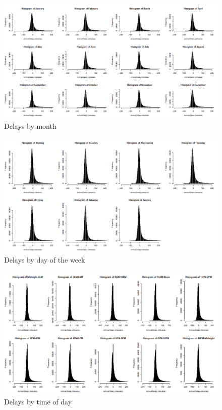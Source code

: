 \documentclass[12pt, a4paper, openany]{book}
\begin{document}
			\begin{figure}[h]
			\centering
	 		\includegraphics[width =1\textwidth]{../figures/PLOTS FOR REPORT/Chapter 4/Figure 4.32}
	 		\caption{Delays by month}
	 		\end{figure}

			\begin{figure}[h]
			\centering
	 		\includegraphics[width = 1 \textwidth]{../figures/PLOTS FOR REPORT/Chapter 4/Figure 4.33}
	 		\caption{Delays by day of the week}
	 		\end{figure}

			\begin{figure}[h]
			\centering
	 		\includegraphics[width = 1\textwidth]{../figures/PLOTS FOR REPORT/Chapter 4/Figure 4.34}
	 		\caption{Delays by time of day}
	 		\end{figure}
\end{document}
